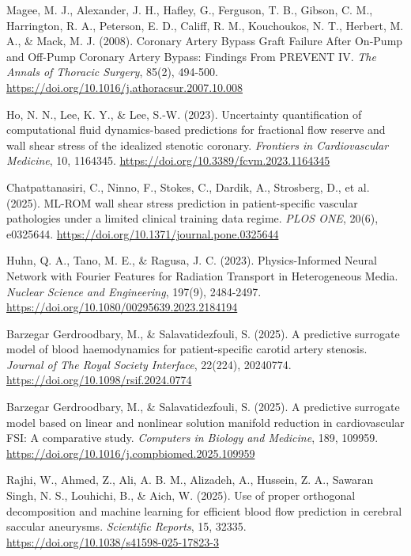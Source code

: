 ﻿\documentclass[12pt,a4paper]{article}
\newcommand{\added}[2][]{\begingroup\color{red}#2\endgroup}
\newcommand{\addp}[1]{\added{#1}}
\theoremstyle{definition}
\numberwithin{equation}{section}
\begin{document}
\begin{thebibliography}{}
{ Magee, M. J., Alexander, J. H., Hafley, G., Ferguson, T. B., Gibson, C. M., Harrington, R. A., Peterson, E. D., Califf, R. M., Kouchoukos, N. T., Herbert, M. A., \& Mack, M. J. (2008). Coronary Artery Bypass Graft Failure After On-Pump and Off-Pump Coronary Artery Bypass: Findings From PREVENT IV. \textit{The Annals of Thoracic Surgery}, 85(2), 494-500. \url{https://doi.org/10.1016/j.athoracsur.2007.10.008}}

{ Ho, N. N., Lee, K. Y., \& Lee, S.-W. (2023). Uncertainty quantification of computational fluid dynamics-based predictions for fractional flow reserve and wall shear stress of the idealized stenotic coronary. \textit{Frontiers in Cardiovascular Medicine}, 10, 1164345. \url{https://doi.org/10.3389/fcvm.2023.1164345}}

{ Chatpattanasiri, C., Ninno, F., Stokes, C., Dardik, A., Strosberg, D., et al. (2025). ML-ROM wall shear stress prediction in patient-specific vascular pathologies under a limited clinical training data regime. \textit{PLOS ONE}, 20(6), e0325644. \url{https://doi.org/10.1371/journal.pone.0325644}}

{ Huhn, Q. A., Tano, M. E., \& Ragusa, J. C. (2023). Physics-Informed Neural Network with Fourier Features for Radiation Transport in Heterogeneous Media. \textit{Nuclear Science and Engineering}, 197(9), 2484-2497. \url{https://doi.org/10.1080/00295639.2023.2184194}}

\addp{ Barzegar Gerdroodbary, M., \& Salavatidezfouli, S. (2025). A predictive surrogate model of blood haemodynamics for patient-specific carotid artery stenosis. \textit{Journal of The Royal Society Interface}, 22(224), 20240774. \url{https://doi.org/10.1098/rsif.2024.0774}}

\addp{ Barzegar Gerdroodbary, M., \& Salavatidezfouli, S. (2025). A predictive surrogate model based on linear and nonlinear solution manifold reduction in cardiovascular FSI: A comparative study. \textit{Computers in Biology and Medicine}, 189, 109959. \url{https://doi.org/10.1016/j.compbiomed.2025.109959}}

\addp{ Rajhi, W., Ahmed, Z., Ali, A. B. M., Alizadeh, A., Hussein, Z. A., Sawaran Singh, N. S., Louhichi, B., \& Aich, W. (2025). Use of proper orthogonal decomposition and machine learning for efficient blood flow prediction in cerebral saccular aneurysms. \textit{Scientific Reports}, 15, 32335. \url{https://doi.org/10.1038/s41598-025-17823-3}}
\end{thebibliography}
\end{document}
